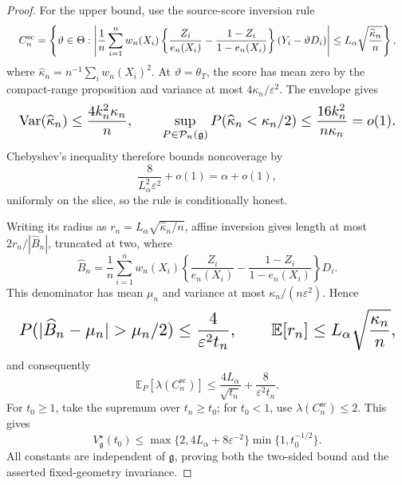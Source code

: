 \documentclass{article}
\begin{document}
\begin{proof}
For the upper bound, use the source-score inversion rule
\[
\makebox[\linewidth][c]{\resizebox{0.98\linewidth}{!}{\(\displaystyle C_n^{\mathrm{sc}}=\left\{\vartheta\in\Theta:
 \left|\frac1n\sum_{i=1}^nw_n(X_i)
 \left\{\frac{Z_i}{e_n(X_i)}-\frac{1-Z_i}{1-e_n(X_i)}\right\}
 (Y_i-\vartheta D_i)\right|
 \le L_\alpha\sqrt{\frac{\widehat\kappa_n}{n}}
 \right\},\)}}
\]
where \(\widehat\kappa_n=n^{-1}\sum_iw_n(X_i)^2\). At \(\vartheta=\theta_T\), the score has mean zero by the compact-range proposition and variance at most \(4\kappa_n/\varepsilon^2\). The envelope gives
\[
\makebox[\linewidth][c]{\resizebox{0.98\linewidth}{!}{\(\displaystyle \operatorname{Var}(\widehat\kappa_n)
 \le\frac{4k_n^2\kappa_n}{n},
 \qquad
 \sup_{P\in\mathcal P_n(\mathfrak g)}
 P(\widehat\kappa_n<\kappa_n/2)
 \le\frac{16k_n^2}{n\kappa_n}=o(1).\)}}
\]
Chebyshev's inequality therefore bounds noncoverage by
\[
 \frac{8}{L_\alpha^2\varepsilon^2}+o(1)=\alpha+o(1),
\]
uniformly on the slice, so the rule is conditionally honest.

Writing its radius as \(r_n=L_\alpha\sqrt{\widehat\kappa_n/n}\), affine inversion gives length at most \(2r_n/|\widehat B_n|\), truncated at two, where
\[
 \widehat B_n=\frac1n\sum_{i=1}^nw_n(X_i)
 \left\{\frac{Z_i}{e_n(X_i)}-
 \frac{1-Z_i}{1-e_n(X_i)}\right\}D_i.
\]
This denominator has mean \(\mu_n\) and variance at most \(\kappa_n/(n\varepsilon^2)\). Hence
\[
\makebox[\linewidth][c]{\resizebox{0.98\linewidth}{!}{\(\displaystyle P(|\widehat B_n-\mu_n|>\mu_n/2)
 \le\frac4{\varepsilon^2t_n},
 \qquad
 \mathbb E[r_n]\le L_\alpha\sqrt{\frac{\kappa_n}{n}},\)}}
\]
and consequently
\[
 \mathbb E_P[\lambda(C_n^{\mathrm{sc}})]
 \le\frac{4L_\alpha}{\sqrt{t_n}}
 +\frac8{\varepsilon^2t_n}.
\]
For \(t_0\ge1\), take the supremum over \(t_n\ge t_0\); for \(t_0<1\), use \(\lambda(C_n^{\mathrm{sc}})\le2\). This gives
\[
 V_{\mathfrak g}^\star(t_0)
 \le\max\{2,4L_\alpha+8\varepsilon^{-2}\}
 \min\{1,t_0^{-1/2}\}.
\]
All constants are independent of \(\mathfrak g\), proving both the two-sided bound and the asserted fixed-geometry invariance.
\end{proof}
\end{document}
